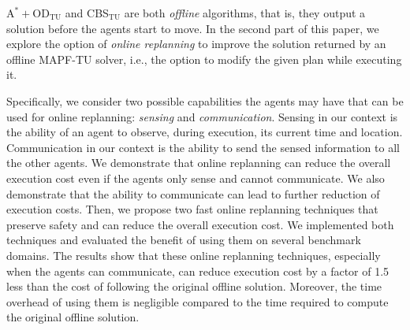 \documentclass[jair,twoside,11pt,theapa]{article}
\newcommand{\eg}{e.g.,}
\newcommand{\odatu}{$\mathrm{A^{*}+OD_{TU}}$\xspace}
\newcommand{\cbstu}{CBS$\mathrm{_{TU}}$\xspace}
\newcommand{\mapftu}{MAPF-TU\xspace}
\begin{document}
\odatu and \cbstu are both \emph{offline} algorithms, that is, they output a solution before the agents start to move. In the second part of this paper, we explore the option of \emph{online replanning} to improve the solution returned by an offline \mapftu solver, i.e., the option to modify the given plan while executing it. 



Specifically, we consider two possible capabilities the agents may have that can be used for online replanning: \emph{sensing} and \emph{communication}. 
Sensing in our context is the ability of an agent to observe, during execution, its current time and location. Communication in our context is the ability to send the sensed information to all the other agents. 
We demonstrate that online replanning can reduce the overall execution cost even if the agents only sense and cannot communicate. 
We also demonstrate that the ability to communicate can lead to further reduction of execution costs. 
Then, we propose two fast online replanning techniques that preserve safety and can reduce the overall execution cost.
We implemented both techniques and evaluated the benefit of using them on several benchmark domains. 
The results show that these online replanning techniques, especially when the agents can communicate, can reduce execution cost by a factor of 1.5 less than the cost of following the original offline solution. 
Moreover, the time overhead of using them is negligible compared to the time required to compute the original offline solution. 
\end{document}
